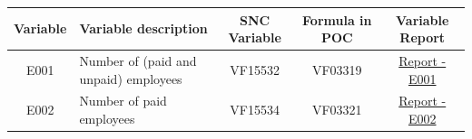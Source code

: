 \documentclass[]{book}
\begin{document}
\begin{longtable}[]{@{}clccc@{}}
\toprule
\begin{minipage}[b]{0.10\columnwidth}\centering
Variable\strut
\end{minipage} & \begin{minipage}[b]{0.25\columnwidth}\raggedright
Variable description\strut
\end{minipage} & \begin{minipage}[b]{0.12\columnwidth}\centering
SNC Variable\strut
\end{minipage} & \begin{minipage}[b]{0.19\columnwidth}\centering
Formula in POC\strut
\end{minipage} & \begin{minipage}[b]{0.20\columnwidth}\centering
Variable Report\strut
\end{minipage}\tabularnewline
\midrule
\endhead
\begin{minipage}[t]{0.10\columnwidth}\centering
E001\strut
\end{minipage} & \begin{minipage}[t]{0.25\columnwidth}\raggedright
Number of (paid and unpaid) employees\strut
\end{minipage} & \begin{minipage}[t]{0.12\columnwidth}\centering
VF15532\strut
\end{minipage} & \begin{minipage}[t]{0.19\columnwidth}\centering
VF03319\strut
\end{minipage} & \begin{minipage}[t]{0.20\columnwidth}\centering
\href{./Auxiliary\%20Files/technical_reports/variable_report/E001.pdf}{Report - E001}\strut
\end{minipage}\tabularnewline
\begin{minipage}[t]{0.10\columnwidth}\centering
E002\strut
\end{minipage} & \begin{minipage}[t]{0.25\columnwidth}\raggedright
Number of paid employees\strut
\end{minipage} & \begin{minipage}[t]{0.12\columnwidth}\centering
VF15534\strut
\end{minipage} & \begin{minipage}[t]{0.19\columnwidth}\centering
VF03321\strut
\end{minipage} & \begin{minipage}[t]{0.20\columnwidth}\centering
\href{./Auxiliary\%20Files/technical_reports/variable_report/E002.pdf}{Report - E002}\strut

\end{minipage}
\end{longtable}
\end{document}
